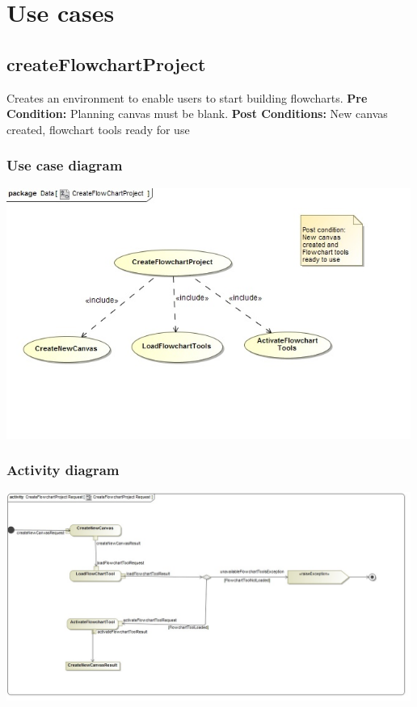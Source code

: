 \documentclass[11pt,a4paper,titlepage]{article}
\begin{document}
\newpage
\section{Use cases}

\subsection{createFlowchartProject}
Creates an environment to enable users to start building flowcharts.
\newline\newline
\textbf{Pre Condition:}
Planning canvas must be blank.\newline\newline
\textbf{Post Conditions:}
New canvas created, flowchart tools ready for use
\subsubsection{Use case diagram}
\includegraphics[width=500px]{CreateFlowChartProject_Usecase.jpg}

\subsubsection{Activity diagram}
\includegraphics[width=500px]{CreateFlowChartProject_Activity.jpg}
\end{document}
